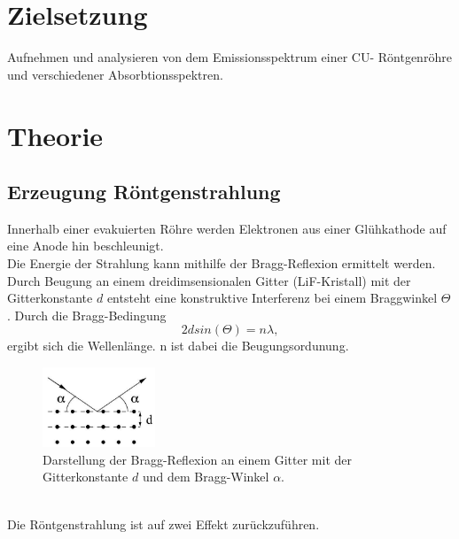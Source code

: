 \newpage
\section*{Zielsetzung}
Aufnehmen und analysieren von dem Emissionsspektrum einer CU-
Röntgenröhre und verschiedener Absorbtionsspektren.
\section{Theorie}
\subsection{Erzeugung Röntgenstrahlung}
Innerhalb einer evakuierten Röhre werden Elektronen aus einer Glühkathode
auf eine Anode hin beschleunigt.\\ 
Die Energie der Strahlung kann mithilfe der Bragg-Reflexion ermittelt werden.
Durch Beugung an einem dreidimsensionalen Gitter (LiF-Kristall) mit der Gitterkonstante $d$ 
entsteht eine konstruktive Interferenz bei einem Braggwinkel $\Theta$. Durch die Bragg-Bedingung
\begin{equation}
    2 d sin(\Theta)=n\lambda,
    \label{eqn:bragg}
\end{equation}
ergibt sich die Wellenlänge. n ist dabei die Beugungsordunung.
\begin{figure}
    \centering
    \includegraphics[width=0.3\textwidth]{plots/bragg.jpg}
    \caption{Darstellung der Bragg-Reflexion an einem Gitter mit der
    Gitterkonstante $d$ und dem Bragg-Winkel $\alpha$.\cite[3]{anleitung}}
\end{figure}
\\Die Röntgenstrahlung ist auf zwei Effekt zurückzuführen.
